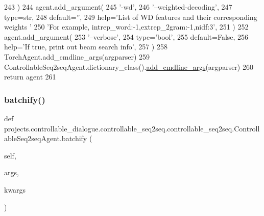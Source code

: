 \begin{DoxyCode}
243         )
244         agent.add\_argument(
245             \textcolor{stringliteral}{'-wd'},
246             \textcolor{stringliteral}{'--weighted-decoding'},
247             type=str,
248             default=\textcolor{stringliteral}{''},
249             help=\textcolor{stringliteral}{'List of WD features and their corresponding weights '}
250             \textcolor{stringliteral}{'For example, intrep\_word:-1,extrep\_2gram:-1,nidf:3'},
251         )
252         agent.add\_argument(
253             \textcolor{stringliteral}{'--verbose'},
254             type=\textcolor{stringliteral}{'bool'},
255             default=\textcolor{keyword}{False},
256             help=\textcolor{stringliteral}{'If true, print out beam search info'},
257         )
258         TorchAgent.add\_cmdline\_args(argparser)
259         ControllableSeq2seqAgent.dictionary\_class().\hyperlink{namespaceparlai_1_1agents_1_1drqa_1_1config_a62fdd5554f1da6be0cba185271058320}{add\_cmdline\_args}(argparser)
260         \textcolor{keywordflow}{return} agent
261 
\end{DoxyCode}
\mbox{\label{classprojects_1_1controllable__dialogue_1_1controllable__seq2seq_1_1controllable__seq2seq_1_1ControllableSeq2seqAgent_a9d31c040b479d9cfeaeecc19a98985ee}} 
\subsubsection{\texorpdfstring{batchify()}{batchify()}}
{\footnotesize\ttfamily def projects.\+controllable\+\_\+dialogue.\+controllable\+\_\+seq2seq.\+controllable\+\_\+seq2seq.\+Controllable\+Seq2seq\+Agent.\+batchify (\begin{DoxyParamCaption}\item[{}]{self,  }\item[{}]{args,  }\item[{}]{kwargs }\end{DoxyParamCaption})}

